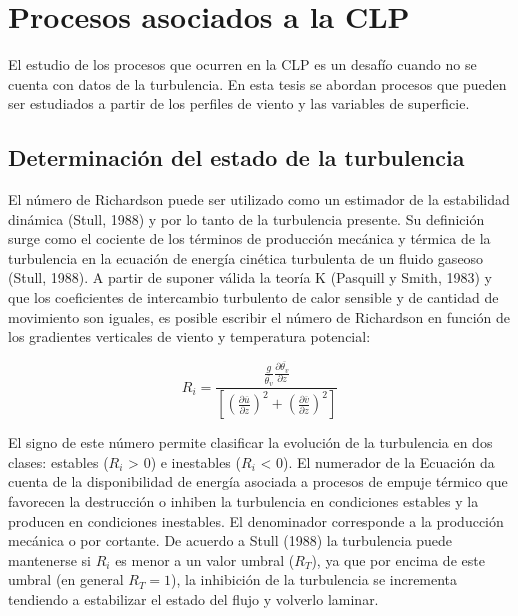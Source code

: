 \documentclass[12pt,spanish,oneside, a4paper]{book}
\begin{document}
\section{Procesos asociados a la CLP}\label{procesos-asociados-a-la-clp}

El estudio de los procesos que ocurren en la CLP es un desafío cuando no
se cuenta con datos de la turbulencia. En esta tesis se abordan procesos
que pueden ser estudiados a partir de los perfiles de viento y las
variables de superficie.

\subsection{Determinación del estado de la
turbulencia}\label{determinacion-del-estado-de-la-turbulencia}

El número de Richardson puede ser utilizado como un estimador de la
estabilidad dinámica (Stull, 1988) y por lo tanto de la turbulencia
presente. Su definición surge como el cociente de los términos de
producción mecánica y térmica de la turbulencia en la ecuación de
energía cinética turbulenta de un fluido gaseoso (Stull, 1988). A partir
de suponer válida la teoría K (Pasquill y Smith, 1983) y que los
coeficientes de intercambio turbulento de calor sensible y de cantidad
de movimiento son iguales, es posible escribir el número de Richardson
en función de los gradientes verticales de viento y temperatura
potencial:

\begin{equation} \label{eq-ri1}
R_i = \frac{\frac{g}{\overline{\theta_v}} \frac{\partial \overline{\theta_v}}{\partial z}}
{\left [ \left (\frac{\partial \overline{u}}{\partial z} \right )^2 + \left (\frac{\partial \overline{v}}{\partial z} \right )^2  \right]}
\end{equation}

El signo de este número permite clasificar la evolución de la
turbulencia en dos clases: estables (\(R_i\) \textgreater{} 0) e
inestables (\(R_i\) \textless{} 0). El numerador de la Ecuación da
cuenta de la disponibilidad de energía asociada a procesos de empuje
térmico que favorecen la destrucción o inhiben la turbulencia en
condiciones estables y la producen en condiciones inestables. El
denominador corresponde a la producción mecánica o por cortante. De
acuerdo a Stull (1988) la turbulencia puede mantenerse si \(R_i\) es
menor a un valor umbral (\(R_T\)), ya que por encima de este umbral (en
general \(R_T = 1\)), la inhibición de la turbulencia se incrementa
tendiendo a estabilizar el estado del flujo y volverlo laminar.
\end{document}

